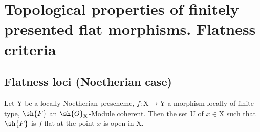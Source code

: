 \setcounter{section}{10}
\section{Topological properties of finitely presented flat morphisms. Flatness criteria}
\label{section:IV.11}


\subsection{Flatness loci (Noetherian case)}
\label{subsection:IV.11.1}


\begin{theorem}[11.1.1]
\label{IV.11.1.1}
Let $\mathrm{Y}$ be a locally Noetherian prescheme, $f:\mathrm{X}\to\mathrm{Y}$ a morphism locally of finite type, $\sh{F}$ an $\sh{O}_\mathrm{X}$-Module coherent. Then the set $\mathrm{U}$ of $x\in\mathrm{X}$ such that $\sh{F}$ is $f$-flat at the point $x$ is open in $\mathrm{X}$.
\end{theorem}

